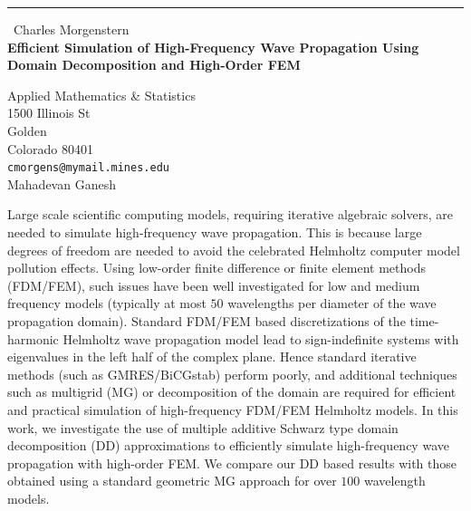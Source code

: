 \documentclass{report}
\begin{document}
\begin{center}
\rule{6in}{1pt} \
{\large Charles Morgenstern \\
{\bf Efficient Simulation of High-Frequency Wave Propagation Using Domain Decomposition and High-Order FEM}}

Applied Mathematics \& Statistics \\ 1500 Illinois St \\ Golden \\ Colorado 80401
\\
{\tt cmorgens@mymail.mines.edu}\\
Mahadevan Ganesh\end{center}

Large scale scientific computing models, requiring iterative algebraic solvers,
are needed to simulate high-frequency wave propagation.
This is because large degrees of freedom are needed to avoid the
celebrated Helmholtz computer model pollution effects.
Using low-order finite difference or finite element methods (FDM/FEM),
such issues have been well investigated for low and medium frequency
models (typically at most $50$ wavelengths per diameter of the wave
propagation domain).
Standard FDM/FEM based discretizations of the time-harmonic Helmholtz
wave propagation model lead to sign-indefinite systems with eigenvalues
in the left half of the complex plane.
Hence standard iterative methods (such as GMRES/BiCGstab) perform poorly,
and additional techniques such as multigrid (MG) or decomposition of the
domain are required for efficient and practical simulation of
high-frequency FDM/FEM Helmholtz models.
In this work, we investigate the use of multiple additive Schwarz type
domain decomposition (DD) approximations to efficiently simulate
high-frequency wave propagation with high-order FEM.
We compare our DD based results with those obtained using a standard
geometric MG approach for over $100$ wavelength models.
\end{document}
